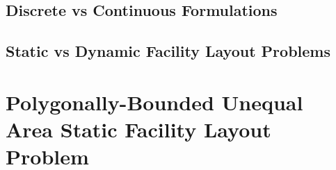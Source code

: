 \subsection{Discrete vs Continuous Formulations}

\subsection{Static vs Dynamic Facility Layout Problems}

\section{Polygonally-Bounded Unequal Area Static Facility Layout Problem}
